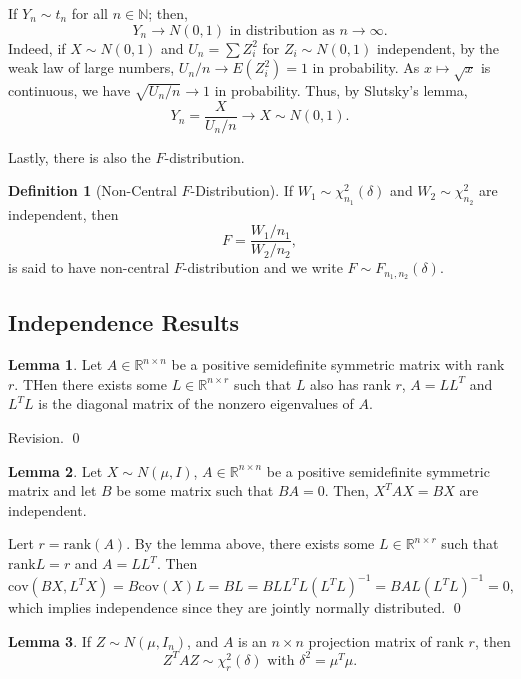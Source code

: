 \documentclass[
]{article}
\theoremstyle{definition}
\theoremstyle{definition}
\newtheorem{definition}{Definition}[section]
\newtheorem{lemma}{Lemma}[section]
\begin{document}
If \(Y_n \sim t_n\) for all \(n \in \mathbb{N}\); then,
\[Y_n \to N(0, 1) \text{ in distribution as } n \to \infty.\] Indeed, if
\(X \sim N(0, 1)\) and \(U_n = \sum Z_i^2\) for \(Z_i \sim N(0, 1)\)
independent, by the weak law of large numbers,
\(U_n / n \to E(Z_i^2) = 1\) in probability. As \(x \mapsto \sqrt{x}\)
is continuous, we have \(\sqrt{U_n / n} \to 1\) in probability. Thus, by
Slutsky's lemma, \[Y_n = \frac{X}{U_n / n} \to X \sim N(0, 1).\]

Lastly, there is also the \(F\)-distribution.

\begin{definition}[Non-Central \(F\)-Distribution]
  If \(W_1 \sim \chi_{n_1}^2(\delta)\) and \(W_2 \sim\chi_{n_2}^2\) are independent, 
  then 
  \[F = \frac{W_1 / n_1}{W_2 / n_2},\]
  is said to have non-central \(F\)-distribution and we write \(F \sim F_{n_1, n_2}(\delta)\).
\end{definition}

\hypertarget{independence-results}{%
\subsection{Independence Results}\label{independence-results}}

\begin{lemma}
  Let \(A \in \mathbb{R}^{n \times n}\) be a positive semidefinite symmetric matrix 
  with rank \(r\). THen there exists some \(L \in \mathbb{R}^{n \times r}\) such 
  that \(L\) also has rank \(r\), \(A = L L^T\) and \(L^TL\) is the diagonal matrix 
  of the nonzero eigenvalues of \(A\).
\end{lemma}
\proof

Revision. \qed

\begin{lemma}
  Let \(X \sim N(\mu, I)\), \(A \in \mathbb{R}^{n \times n}\) be a positive 
  semidefinite symmetric matrix and let \(B\) be some matrix such that \(BA = 0\). 
  Then, \(X^T A X = BX\) are independent.
\end{lemma}
\proof

Lert \(r = \text{rank}(A)\). By the lemma above, there exists some
\(L \in \mathbb{R}^{n \times r}\) such that \(\text{rank} L = r\) and
\(A = LL^T\). Then
\[\text{cov}(BX, L^TX) = B\text{cov}(X)L = BL = BLL^TL(L^TL)^{-1} = 
  BAL(L^TL)^{-1} = 0,\] which implies independence since they are
jointly normally distributed. \qed

\begin{lemma}
  If \(Z \sim N(\mu, I_n)\), and \(A\) is an \(n \times n\) projection matrix of 
  rank \(r\), then 
  \[Z^T A Z \sim \chi_r^2(\delta) \text{ with } \delta^2 = \mu^T \mu.\]
\end{lemma}
\proof
\end{document}
